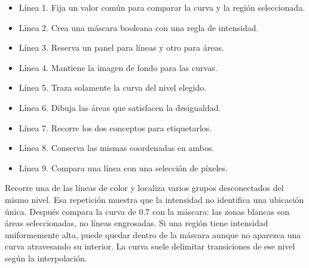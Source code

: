 \begin{itemize}

\item Línea 1. Fija un valor común para comparar la curva y la región seleccionada.

\item Línea 2. Crea una máscara booleana con una regla de intensidad.

\item Línea 3. Reserva un panel para líneas y otro para áreas.

\item Línea 4. Mantiene la imagen de fondo para las curvas.

\item Línea 5. Traza solamente la curva del nivel elegido.

\item Línea 6. Dibuja las áreas que satisfacen la desigualdad.

\item Línea 7. Recorre los dos conceptos para etiquetarlos.

\item Línea 8. Conserva las mismas coordenadas en ambos.

\item Línea 9. Compara una línea con una selección de píxeles.

\end{itemize}





Recorre una de las líneas de color y localiza varios grupos desconectados del mismo nivel. Esa repetición muestra que la intensidad no identifica una ubicación única. Después compara la curva de 0.7 con la máscara: las zonas blancas son áreas seleccionadas, no líneas engrosadas. Si una región tiene intensidad uniformemente alta, puede quedar dentro de la máscara aunque no aparezca una curva atravesando su interior. La curva suele delimitar transiciones de ese nivel según la interpolación.


